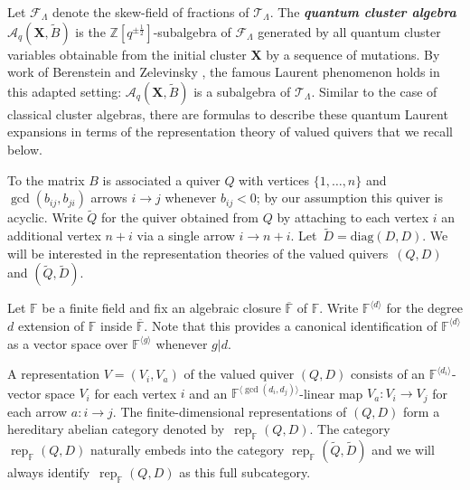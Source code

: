 \documentclass[12pt]{amsart}
\newcommand{\bfX}{\mathbf{X}}
\newcommand{\cA}{\mathcal{A}}
\newcommand{\cF}{\mathcal{F}}
\newcommand{\cT}{\mathcal{T}}
\newcommand{\FF}{\mathbb{F}}
\newcommand{\half}{{\frac{1}{2}}}
\newcommand{\rep}{\operatorname{rep}}
\newcommand{\ZZ}{\mathbb{Z}}
\newcommand{\newword}[1]{\textbf{\emph{#1}}}
\begin{document}
  Let $\cF_\Lambda$ denote the skew-field of fractions of $\cT_\Lambda$.
  The \newword{quantum cluster algebra} $\cA_q(\bfX,\widetilde{B})$ is the $\ZZ[q^{\pm\half}]$-subalgebra of $\cF_\Lambda$ generated by all quantum cluster variables obtainable from the initial cluster $\bfX$ by a sequence of mutations.
  By work of Berenstein and Zelevinsky \cite{berenstein-zelevinsky}, the famous Laurent phenomenon holds in this adapted setting: $\cA_q(\bfX,\widetilde{B})$ is a subalgebra of $\cT_\Lambda$.
  Similar to the case of classical cluster algebras, there are formulas to describe these quantum Laurent expansions in terms of the representation theory of valued quivers that we recall below.

  To the matrix $B$ is associated a quiver $Q$ with vertices $\{1,\ldots,n\}$ and $\gcd(b_{ij},b_{ji})$ arrows $i\longrightarrow j$ whenever $b_{ij}<0$; by our assumption this quiver is acyclic.
  Write $\widetilde{Q}$ for the quiver obtained from $Q$ by attaching to each vertex $i$ an additional vertex $n+i$ via a single arrow $i\to n+i$. 
  Let~$\widetilde{D}=\mathrm{diag}(D,D)$.
  We will be interested in the representation theories of the valued quivers~$(Q,D)$ and  $(\widetilde{Q},\widetilde{D})$.

  Let $\FF$ be a finite field and fix an algebraic closure $\overline{\FF}$ of $\FF$.  
  Write $\FF^{\langle d\rangle}$ for the degree $d$ extension of $\FF$ inside $\overline{\FF}$.
  Note that this provides a canonical identification of $\FF^{\langle d\rangle}$ as a vector space over $\FF^{\langle g\rangle}$ whenever $g|d$.  
  
  A representation $V=(V_i,V_a)$ of the valued quiver $(Q,D)$ consists of an $\FF^{\langle d_i\rangle}$-vector space $V_i$ for each vertex $i$ and an $\FF^{\langle\gcd(d_i,d_j)\rangle}$-linear map $V_a:V_i\to V_j$ for each arrow $a:i\to j$.  
  The finite-dimensional representations of $(Q,D)$ form a hereditary abelian category denoted by~$\rep_\FF(Q,D)$.  
  The category $\rep_\FF(Q,D)$ naturally embeds into the category $\rep_\FF(\widetilde{Q},\widetilde{D})$ and we will always identify~$\rep_\FF(Q,D)$ as this full subcategory.
\end{document}
